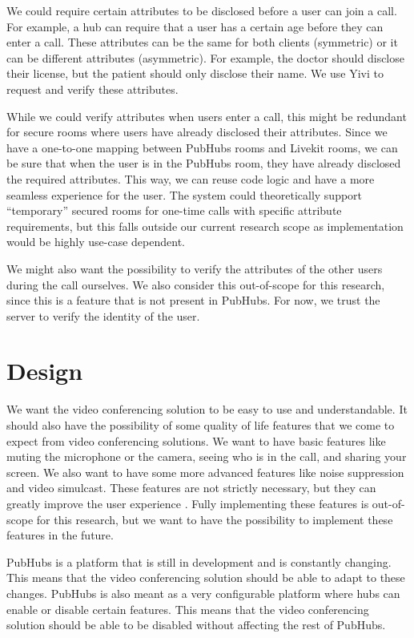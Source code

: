 \documentclass{report}
\begin{document}
We could require certain attributes to be disclosed before a user can join a call. For example, a hub
can require that a user has a certain age before they can enter a call. These attributes can be the same for both
clients (symmetric) or it can be different attributes (asymmetric). For example, the doctor should disclose their license,
but the patient should only disclose their name. We use Yivi to request and verify these attributes.

While we could verify attributes when users enter a call, this might be redundant for secure rooms where users have
already disclosed their attributes. Since we have a one-to-one mapping between PubHubs rooms and Livekit rooms, we
can be sure that when the user is in the PubHubs room, they have already disclosed the required attributes. This way,
we can reuse code logic and have a more seamless experience for the user. The system could theoretically support
“temporary” secured rooms for one-time calls with specific attribute requirements, but this falls outside our current
research scope as implementation would be highly use-case dependent.

We might also want the possibility to verify the attributes of the other users during the call ourselves. We also
consider this out-of-scope for this research, since this is a feature that is not present in PubHubs. For now, we trust
the server to verify the identity of the user.

\section{Design}
We want the video conferencing solution to be easy to use and understandable. It should also have the possibility of
some quality of life features that we come to expect from video conferencing solutions. We want to have basic
features like muting the microphone or the camera, seeing who is in the call, and sharing your screen. We also want
to have some more advanced features like noise suppression and video simulcast. These features are not strictly
necessary, but they can greatly improve the user experience \cite{skowronek_quality_2022}.
Fully implementing these features is out-of-scope for this research, but we want to have the possibility to implement
these features in the future.

PubHubs is a platform that is still in development and is constantly changing. This means that the video
conferencing solution should be able to adapt to these changes. PubHubs is also meant as a very configurable platform
where hubs can enable or disable certain features. This means that the video conferencing solution should be able to
be disabled without affecting the rest of PubHubs.
\end{document}
